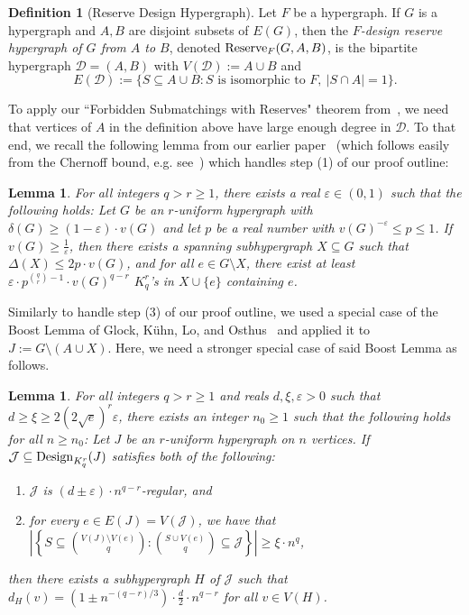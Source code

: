 \documentclass[11pt]{article}
\newcommand{\mc}[1]{\mathcal{#1}}
\newcounter{i}
\theoremstyle{plain}
\newtheorem{lem}[thm]{Lemma}
\theoremstyle{plain} %
\theoremstyle{definition}
\newtheorem{definition}[thm]{Definition}
\begin{document}
\begin{definition}[Reserve Design Hypergraph]
Let $F$ be a hypergraph. If $G$ is a hypergraph and $A,B$ are disjoint subsets of $E(G)$, then the \emph{$F$-design reserve hypergraph of $G$ from $A$ to $B$}, denoted ${\rm Reserve}_F(G,A,B)$, %
is the bipartite hypergraph $\mathcal{D}=(A,B)$ with $V(\mathcal{D}):=A\cup B$ and $$E(\mathcal{D}) := \{S\subseteq A\cup B: S \text{ is isomorphic to } F,~|S\cap A|=1\}.$$
\end{definition}

To apply our ``Forbidden Submatchings with Reserves" theorem from~\cite{DP22}, we need that vertices of $A$ in the definition above have large enough degree in $\mc{D}$. To that end, we recall the following lemma from our earlier paper~\cite{DPI} (which follows easily from the Chernoff bound, e.g. see~\cite{AS16}) which handles step (1) of our proof outline:

\begin{lem}\label{lem:RandomX}
For all integers $q> r\ge 1$, there exists a real $\varepsilon \in (0,1)$ such that the following holds: Let $G$ be an $r$-uniform hypergraph with $\delta(G)\ge (1-\varepsilon)\cdot v(G)$ and let $p$ be a real number with $v(G)^{-\varepsilon} \le p \le 1$. If $v(G)\ge \frac{1}{\varepsilon}$, then there exists a spanning subhypergraph  $X\subseteq G$ such that $\Delta(X)\le 2p\cdot v(G)$, and for all $e\in G\setminus X$, there exist at least $\varepsilon\cdot p^{\binom{q}{r}-1}\cdot v(G)^{q-r}$ $K_q^r$'s in $X\cup \{e\}$ containing $e$.
\end{lem}

Similarly to handle step (3) of our proof outline, we used a special case of the Boost Lemma of Glock, K\"{u}hn, Lo, and Osthus~\cite{GKLO16} and applied it to $J:= G\setminus (A\cup X)$. Here, we need a stronger special case of said Boost Lemma as follows.


\begin{lem}\label{lem:RegBoost}
For all integers $q> r \ge 1$ and reals $d, \xi, \varepsilon > 0$ such that $d \ge \xi \ge 2(2\sqrt{e})^r \varepsilon$, there exists an integer $n_0\ge 1$ such that the following holds for all $n\ge n_0$: Let $J$ be an $r$-uniform hypergraph on $n$ vertices. If $\mathcal{J} \subseteq {\rm Design}_{K_q^r}(J)$ satisfies both of the following:
\begin{enumerate}
    \item[(a)] $\mathcal{J}$ is $(d\pm \varepsilon)\cdot n^{q-r}$-regular, and
    \item[(b)] for every $e\in E(J)=V(\mathcal{J})$, we have that
    $\left|\left\{ S\subseteq \binom{V(J)\setminus V(e)}{q}: \binom{S\cup V(e)}{q}\subseteq \mathcal{J} \right\}\right| \ge \xi\cdot n^q$,
\end{enumerate} 
then there exists a subhypergraph $H$ of $\mathcal{J}$ such that $d_H(v) = \left(1 \pm n^{-(q-r)/3}\right) \cdot \frac{d}{2} \cdot n^{q-r}$ for all $v\in V(H)$. 
\end{lem}
\end{document}
